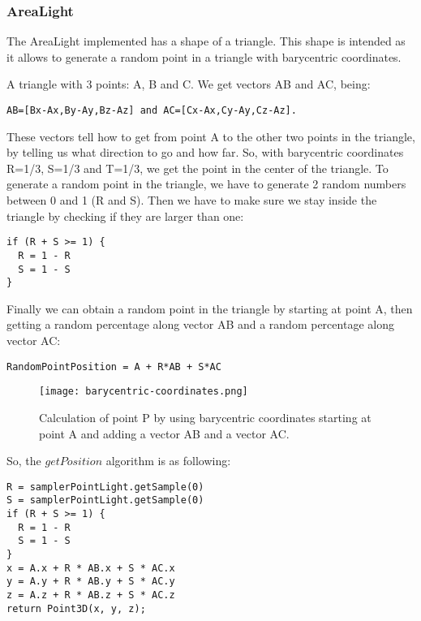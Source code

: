\subsubsection{AreaLight}

\par
The AreaLight implemented has a shape of a triangle.
This shape is intended as it allows to generate a random point in a triangle with barycentric coordinates.

\par
A triangle with 3 points: A, B and C.
We get vectors AB and AC, being:

\begin{lstlisting}
AB=[Bx-Ax,By-Ay,Bz-Az] and AC=[Cx-Ax,Cy-Ay,Cz-Az].
\end{lstlisting}

\par
These vectors tell how to get from point A to the other two points in the triangle, by telling us what direction to go and how far.
So, with barycentric coordinates R=1/3, S=1/3 and T=1/3, we get the point in the center of the triangle.
To generate a random point in the triangle, we have to generate 2 random numbers between 0 and 1 (R and S).
Then we have to make sure we stay inside the triangle by checking if they are larger than one:

\begin{lstlisting}
if (R + S >= 1) {
  R = 1 - R
  S = 1 - S
}
\end{lstlisting}

Finally we can obtain a random point in the triangle by starting at point A, then getting a random percentage along vector AB and a random percentage along vector AC:

\begin{lstlisting}
RandomPointPosition = A + R*AB + S*AC
\end{lstlisting}

\begin{figure}[H]
	\centering
	\caption{Calculation of point P by using barycentric coordinates starting at point A and adding a vector AB and a vector AC.}
	\label{Barycentric_Coordinates.}
	\texttt{[image: barycentric-coordinates.png]}
\end{figure}

\par
So, the
$getPosition$
algorithm is as following:

\begin{lstlisting}
R = samplerPointLight.getSample(0)
S = samplerPointLight.getSample(0)
if (R + S >= 1) {
  R = 1 - R
  S = 1 - S
}
x = A.x + R * AB.x + S * AC.x
y = A.y + R * AB.y + S * AC.y
z = A.z + R * AB.z + S * AC.z
return Point3D(x, y, z);
\end{lstlisting}

